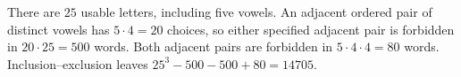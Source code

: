 There are $25$ usable letters, including five vowels. An adjacent ordered pair of distinct vowels has $5\cdot4=20$ choices, so either specified adjacent pair is forbidden in $20\cdot25=500$ words. Both adjacent pairs are forbidden in $5\cdot4\cdot4=80$ words. Inclusion--exclusion leaves $25^3-500-500+80=\boxed{14705}$.
